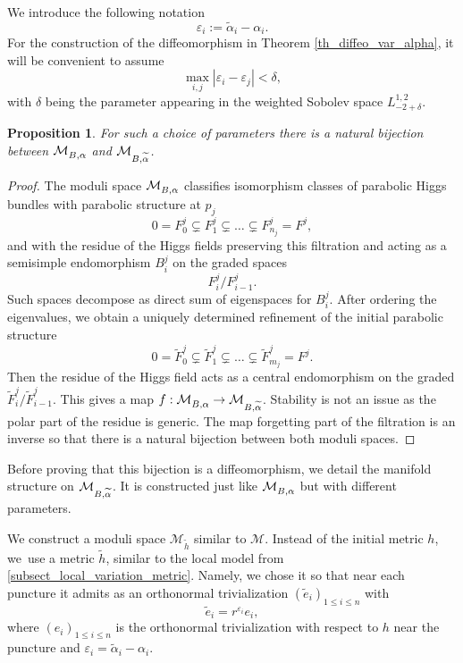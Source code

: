\documentclass[11pt]{article}
\newcommand{\NoChangel}[1]{%
\expandafter\let\csname old\string#1\endcsname=#1
\let#1=\relax
\newcommand{#1}{\mathcode`l="716C\csname old\string#1\endcsname\mathcode`l="7160 }%
}
\newcommand{\Dol}{\mathrm{Dol}}\NoChangel{\Dol}
\let\epsilon\varepsilon
\theoremstyle{definition}
\theoremstyle{plain}
\newtheorem{proposition}[definition]{Proposition}
\begin{document}
We introduce the following notation
\[
\epsilon_i := \widetilde{\alpha}_i-\alpha_i.
\]
For the construction of the diffeomorphism in Theorem \ref{th_diffeo_var_alpha}, it will be convenient to assume
\[
\max_{i,j}|\epsilon_i-\epsilon_j| < \delta,
\]
with $\delta$ being the parameter appearing in the weighted Sobolev space $L^{1,2}_{-2+\delta}$.
\begin{proposition}\label{prop_bijection_dol}
For such a choice of parameters there is a natural bijection between $\mathcal{M}^{\Dol}_{B,\alpha}$ and $\mathcal{M}^{\Dol}_{B,\widetilde{\alpha}}$.
\end{proposition}
\begin{proof}
The moduli space $\mathcal{M}^{\Dol}_{B,\alpha}$ classifies isomorphism classes of parabolic Higgs bundles with parabolic structure at $p_j$
\[
0= F^j_0 \subsetneq F^j_1 \subsetneq \dots \subsetneq F^j_{n_j}=F^j,
\]
and with the residue of the Higgs fields preserving this filtration and acting as a semisimple endomorphism $B^j_i$ on the graded spaces
\[
F^j_i / F^j_{i-1}.
\]
Such spaces decompose as direct sum of eigenspaces for $B^j_i$. After ordering the eigenvalues, we obtain a uniquely determined refinement of the initial parabolic structure
\[
0 = \widetilde{F}^j_0 \subsetneq \widetilde{F}^j_1 \subsetneq \dots \subsetneq \widetilde{F}^j_{m_j} = F^j.
\]
Then the residue of the Higgs field acts as a central endomorphism on the graded $\widetilde{F}^j_i / \widetilde{F}^j_{i-1}$.
This gives a map $f:\mathcal{M}^{\Dol}_{B,\alpha}\to \mathcal{M}^{\Dol}_{B,\widetilde{\alpha}}$. Stability is not an issue as the polar part of the residue is generic. The map forgetting part of the filtration is an inverse so that there is a natural bijection between both moduli spaces.
\end{proof}

Before proving that this bijection is a diffeomorphism, we detail the manifold structure on $\mathcal{M}_{B,\widetilde{\alpha}}^{\Dol}$. It is constructed just like $\mathcal{M}^{\Dol}_{B,\alpha}$ but with different parameters.

We construct a moduli space $\mathcal{M}_{\widetilde{h}}$ similar to $\mathcal{M}$. Instead of the initial metric $h$, we~use a metric $\widetilde{h}$, similar to the local model from \ref{subsect_local_variation_metric}. Namely, we chose it so that near each puncture it admits as an orthonormal trivialization $(\widetilde{e}_i)_{1\le i \le n}$ with
\[
\widetilde{e}_i = r^{\epsilon_i} e_i,
\]
where $(e_i)_{1\le i \le n}$ is the orthonormal trivialization with respect to $h$ near the puncture and $\epsilon_i=\widetilde{\alpha}_i-\alpha_i$.
\end{document}
